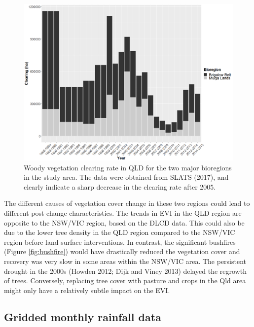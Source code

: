 \documentclass[fleqn,10pt,lineno]{wlpeerj} %
\begin{document}
\begin{figure}
\includegraphics[width=0.9\linewidth]{figures/slats} \caption{Woody vegetation clearing rate in QLD for the two major bioregions in the study area. The data were obtained from SLATS (2017), and clearly indicate a sharp decrease in the clearing rate after 2005.}\label{fig:slat}
\end{figure}

The different causes of vegetation cover change in these two regions
could lead to different post-change characteristics. The trends in EVI
in the QLD region are opposite to the NSW/VIC region, based on the DLCD
data. This could also be due to the lower tree density in the QLD region
compared to the NSW/VIC region before land surface interventions. In
contrast, the significant bushfires (Figure \ref{fig:bushfire}) would
have drastically reduced the vegetation cover and recovery was very slow
in some areas within the NSW/VIC area. The persistent drought in the
2000s (Howden 2012; Dijk and Viney 2013) delayed the regrowth of trees.
Conversely, replacing tree cover with pasture and crops in the Qld area
might only have a relatively subtle impact on the EVI.

\subsection{Gridded monthly rainfall
data}\label{gridded-monthly-rainfall-data}
\end{document}
